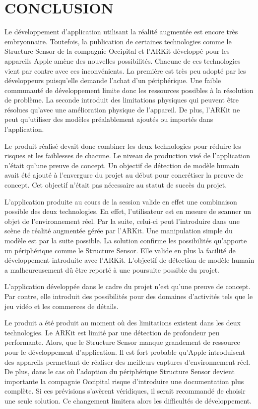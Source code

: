 \documentclass[rapport.tex]{subfiles}
\begin{document}
\chapter*{\uppercase{CONCLUSION}}
Le développement d’application utilisant la réalité augmentée est encore très embryonnaire. Toutefois, la publication de certaines technologies comme le Structure Sensor de la compagnie Occipital et l’ARKit développé pour les appareils Apple amène des nouvelles possibilités. Chacune de ces technologies vient par contre avec ces inconvénients. La première est très peu adopté par les développeurs puisqu’elle demande l’achat d’un périphérique. Une faible communauté de développement limite donc les ressources possibles à la résolution de problème. La seconde introduit des limitations physiques qui peuvent être résolues qu’avec une amélioration physique de l’appareil. De plus, l’ARKit ne peut qu'utiliser des modèles préalablement ajoutés ou importés dans l’application.
\par
Le produit réalisé devait donc combiner les deux technologies pour réduire les risques et les faiblesses de chacune. Le niveau de production visé de l’application n'était qu’une preuve de concept. Un objectif de détection de modèle humain avait été ajouté à l’envergure du projet au début pour concrétiser la preuve de concept. Cet objectif n’était pas nécessaire au statut de succès du projet.
\par
L'application produite au cours de la session valide en effet une combinaison possible des deux technologies. En effet, l’utilisateur est en mesure de scanner un objet de l’environnement réel. Par la suite, celui-ci peut l’introduire dans une scène de réalité augmentée gérée par l’ARKit. Une manipulation simple du modèle est par la suite possible. La solution confirme les possibilités qu’apporte un périphérique comme le Structure Sensor. Elle valide en plus la facilité de développement introduite avec l’ARKit. L’objectif de détection de modèle humain a malheureusement dû être reporté à une poursuite possible du projet.
\par
L’application développée dans le cadre du projet n’est qu’une preuve de concept. Par contre, elle introduit des possibilités pour des domaines d’activités tels que le jeu vidéo et les commerces de détails.
\par
Le produit a été produit au moment où des limitations existent dans les deux technologies. Le ARKit est limité par une détection de profondeur peu performante. Alors, que le Structure Sensor manque grandement de ressource pour le développement d’application. Il est fort probable qu’Apple introduisent des appareils permettant de réaliser des meilleurs captures d’environnement réel. De plus, dans le cas où l’adoption du périphérique Structure Sensor devient importante la compagnie Occipital risque d’introduire une documentation plus complète. Si ces prévisions s’avèrent véridiques, il serait recommandé de choisir une seule solution. Ce changement limitera alors les difficultés de développement.
\end{document}
